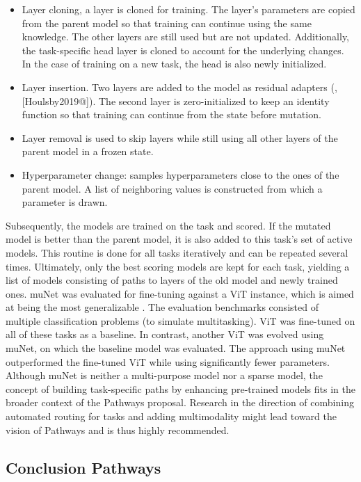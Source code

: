 \documentclass[
]{krantz}
\providecommand{\tightlist}{%
  \setlength{\itemsep}{0pt}\setlength{\parskip}{0pt}}
\begin{document}
\begin{itemize}
\tightlist
\item
  Layer cloning, a layer is cloned for training. The layer's parameters are copied from the parent model so that training can continue using the same knowledge. The other layers are still used but are not updated. Additionally, the task-specific head layer is cloned to account for the underlying changes. In the case of training on a new task, the head is also newly initialized.
\item
  Layer insertion. Two layers are added to the model as residual adapters (\citep{Rebuffi2017}, {[}Houlsby2019@{]}). The second layer is zero-initialized to keep an identity function so that training can continue from the state before mutation.
\item
  Layer removal is used to skip layers while still using all other layers of the parent model in a frozen state.
\item
  Hyperparameter change: samples hyperparameters close to the ones of the parent model. A list of neighboring values is constructed from which a parameter is drawn.
\end{itemize}

Subsequently, the models are trained on the task and scored. If the mutated model is better than the parent model, it is also added to this task's set of active models. This routine is done for all tasks iteratively and can be repeated several times. Ultimately, only the best scoring models are kept for each task, yielding a list of models consisting of paths to layers of the old model and newly trained ones.
muNet was evaluated for fine-tuning against a ViT instance, which is aimed at being the most generalizable \citep{Steiner2021}. The evaluation benchmarks consisted of multiple classification problems (to simulate multitasking). ViT was fine-tuned on all of these tasks as a baseline. In contrast, another ViT was evolved using muNet, on which the baseline model was evaluated. The approach using muNet outperformed the fine-tuned ViT while using significantly fewer parameters.
Although muNet is neither a multi-purpose model nor a sparse model, the concept of building task-specific paths by enhancing pre-trained models fits in the broader context of the Pathways proposal. Research in the direction of combining automated routing for tasks and adding multimodality might lead toward the vision of Pathways and is thus highly recommended.

\hypertarget{conclusion-pathways}{%
\subsection{Conclusion Pathways}\label{conclusion-pathways}}
\end{document}
